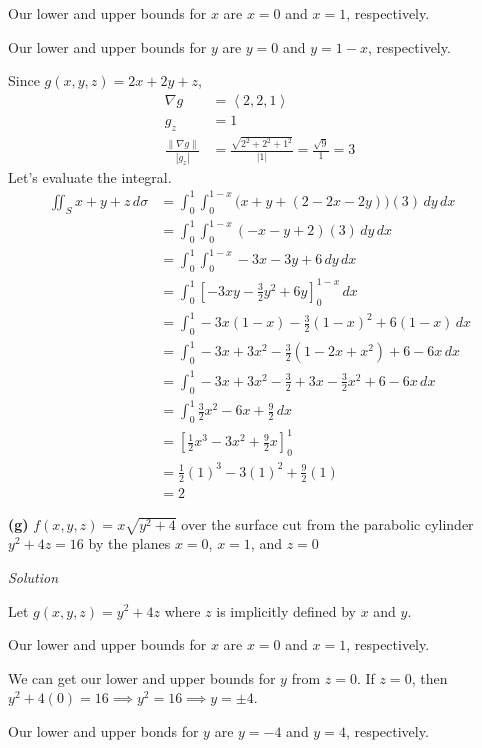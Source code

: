 \documentclass{article}
\newcommand{\lrp}[1]{\left( #1 \right)}
\newcommand{\lra}[1]{\left\langle #1 \right\rangle}
\newcommand{\lrb}[1]{\left[ #1 \right]}
\newcommand{\norm}[1]{\left\lVert #1 \right\rVert}
\newcommand{\Solution}{\textit{Solution}}
\begin{document}
Our lower and upper bounds for $x$ are $x=0$ and $x=1$, respectively.

Our lower and upper bounds for $y$ are $y=0$ and $y=1-x$, respectively.

Since $g(x,y,z)=2x+2y+z$,
\begin{align*}
    \nabla g&=\lra{2,2,1}\\
    g_z&=1\\
    \frac{\norm{\nabla g}}{\left|g_z\right|}&=\frac{\sqrt{2^2+2^2+1^2}}{\left|1\right|}=\frac{\sqrt{9}}{1}=3
\end{align*}
Let's evaluate the integral.
\begin{align*}
     \iint_{S}x+y+z\,d\sigma&=\int_0^1\int_0^{1-x}\big(x+y+\lrp{2-2x-2y}\big)\lrp{3}\,dy\,dx\tag{$2x+2y+z=2\implies z=2-2x-2y$}\\
    &=\int_0^1\int_0^{1-x}\lrp{-x-y+2}\lrp{3}\,dy\,dx\\
    &=\int_0^1 \int_0^{1-x}-3x-3y+6\,dy\,dx\\
    &=\int_0^1 \lrb{-3xy-\frac{3}{2}y^2+6y}_0^{1-x}\,dx\\
    &=\int_0^1 -3x(1-x)-\frac{3}{2}(1-x)^2+6(1-x)\,dx\\
    &=\int_0^1 -3x+3x^2-\frac{3}{2}(1-2x+x^2)+6-6x\,dx\\
    &=\int_0^1-3x+3x^2-\frac{3}{2}+3x-\frac{3}{2}x^2+6-6x\,dx\\
    &=\int_0^1 \frac{3}{2}x^2 -6x +\frac{9}{2}\,dx\\
    &=\lrb{\frac{1}{2}x^3-3x^2+\frac{9}{2}x}_0^1\\
    &=\frac{1}{2}(1)^3-3(1)^2+\frac{9}{2}(1)\\
    &=\boxed{2}\tag{use a calculator}
\end{align*}
{}\textbf{(g)} $f(x,y,z)=x\sqrt{y^2+4}$ over the surface cut from the parabolic cylinder $y^2+4z=16$ by the planes $x=0$, $x=1$, and $z=0$

\Solution

Let $g(x,y,z)=y^2+4z$ where $z$ is implicitly defined by $x$ and $y$. 

Our lower and upper bounds for $x$ are $x=0$ and $x=1$, respectively.

We can get our lower and upper bounds for $y$ from $z=0$. If $z=0$, then $y^2+4(0)=16\implies y^2=16\implies y=\pm 4$.

Our lower and upper bonds for $y$ are $y=-4$ and $y=4$, respectively.
\end{document}
